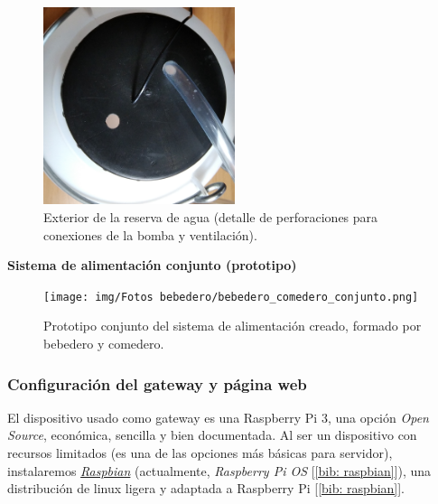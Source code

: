\documentclass[12pt]{article}
\begin{document}
	\begin{figure}[h!]
		\begin{center}
			\includegraphics[width=0.5\textwidth]{img/Fotos bebedero/agujeros_reserva_superior.png}
			\caption{Exterior de la reserva de agua (detalle de perforaciones para conexiones de la bomba y ventilación).}
			\label{Prototipo: reserva agua (detalle exterior superior)}
		\end{center}
	\end{figure}
	
	\pagebreak
	
	\noindent \textbf{Sistema de alimentación conjunto (prototipo)} \\

	\begin{figure}[h!]
		\begin{center}
			\texttt{[image: img/Fotos bebedero/bebedero\_comedero\_conjunto.png]}
			\caption{Prototipo conjunto del sistema de alimentación creado, formado por bebedero y comedero.}
			\label{Prototipo: conjunto bebedero comedero}
		\end{center}
	\end{figure}

	\pagebreak	
	
	\subsubsection{Configuración del gateway y página web}
	\label{subsubsection: config GW y web}
	
	\noindent El dispositivo usado como gateway es una Raspberry Pi 3, una opción \textit{Open Source}, económica, sencilla y bien documentada. Al ser un dispositivo con recursos limitados (es una de las opciones más básicas para servidor), instalaremos \href{https://www.raspberrypi.org/software/operating-systems/}{\textit{Raspbian}} (actualmente, \textit{Raspberry Pi OS} [\ref{bib: raspbian}]), una distribución de linux ligera y adaptada a Raspberry Pi [\ref{bib: raspbian}]. \\
	
\end{document}
